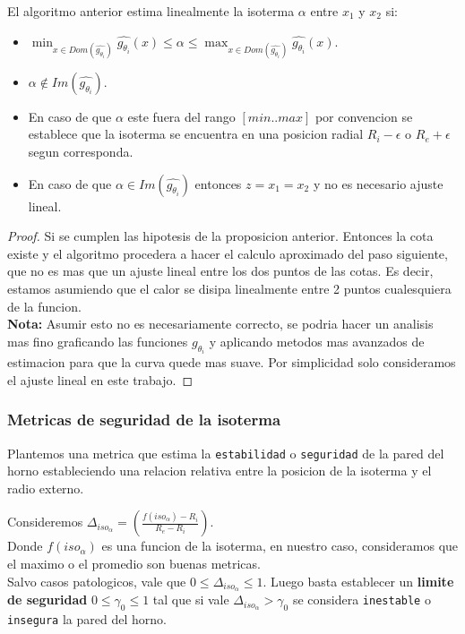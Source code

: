 \begin{proposition}
    El algoritmo anterior estima linealmente la isoterma $\alpha$ entre $x_1$ y $x_2$ si:
    \begin{itemize}
        \item $\displaystyle\min_{x \in Dom(\hat{g_{\theta_i}})}{\hat{g_{\theta_i}}(x)} \leq \alpha \leq \displaystyle\max_{x \in Dom(\hat{g_{\theta_i}})}{\hat{g_{\theta_i}}(x)}$.
        \item $\alpha \notin Im(\hat{g_{\theta_i}})$.
    \end{itemize}
    \begin{itemize}
        \item En caso de que $\alpha$ este fuera del rango $[min..max]$ por convencion se establece que la isoterma se encuentra en una posicion radial $R_i - \epsilon$ o $R_e + \epsilon$ segun corresponda.
        \item En caso de que $\alpha \in Im(\hat{g_{\theta_i}})$ entonces $z = x_1 = x_2$ y no es necesario ajuste lineal.
    \end{itemize}
\end{proposition}
\begin{proof}
    Si se cumplen las hipotesis de la proposicion anterior. Entonces la cota existe y el algoritmo  procedera a hacer el calculo aproximado del paso siguiente, que no es mas que un ajuste lineal entre los dos puntos de las cotas. Es decir, estamos asumiendo que el calor se disipa linealmente entre 2 puntos cualesquiera de la funcion.\\
    \vspace{0.3cm}
    \textbf{Nota:} Asumir esto no es necesariamente correcto, se podria hacer un analisis mas fino graficando las funciones $g_{\theta_i}$ y aplicando metodos mas avanzados de estimacion para que la curva quede mas suave. Por simplicidad solo consideramos el ajuste lineal en este trabajo.
\end{proof}

\subsubsection{Metricas de seguridad de la isoterma}
Plantemos una metrica que estima la \texttt{estabilidad} o \texttt{seguridad} de la pared del horno estableciendo una relacion relativa entre la posicion de la isoterma y el radio externo. 
\begin{proposition}
    Consideremos $\Delta_{iso_\alpha} = \left( \frac{f(iso_\alpha) - R_i}{R_e - R_i} \right)$.\\
    Donde $f(iso_\alpha)$ es una funcion de la isoterma, en nuestro caso, consideramos que el maximo o el promedio son buenas metricas.\\
    Salvo casos patologicos, vale que $0 \leq \Delta_{iso_\alpha}\leq 1$. Luego basta establecer un \textbf{limite de seguridad} $0 \leq \gamma_0 \leq 1$ tal que si vale $\Delta_{iso_\alpha} > \gamma_0$ se considera \texttt{inestable} o \texttt{insegura} la pared del horno.
\end{proposition}

